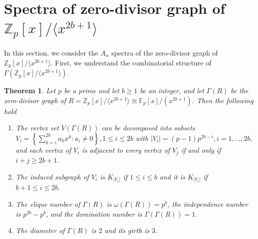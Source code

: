 \documentclass[12pt,twoside]{article}
\newtheorem{theorem}{Theorem}[section]
\begin{document}
\section{Spectra of zero-divisor graph of $\mathbb{Z}_p[x]/\langle x^{2b+1}\rangle $}\label{section 3}
In this section, we consider the $A_{\alpha}$ spectra of the zero-divisor graph of $\mathbb{Z}_p[x]/\langle x^{2b+1}\rangle $. First, we understand the combinatorial structure of $  \varGamma(\mathbb{Z}_p[x]/\langle x^{2b+1}\rangle).$
\begin{theorem} \label{odd case}
	Let $p$ be a prime and let $b\ge 1$ be an integer, and let $ \varGamma(R)$ be the zero-divisor graph of $R=\mathbb{Z}_p[x]/\langle x^{2b+1}\rangle \cong \mathbb{F}_p[x]/(x^{2b+1})$. Then the following hold
	\begin{enumerate}
		\item The vertex set $V( \varGamma(R))$ can be decomposed into subsets $V_i
		= \left\{
		\sum_{k=i}^{2b} a_k x^k : a_i \neq 0
		\right\},  1\le i \le 2b$ with $ 	|V_i|
		= (p-1)p^{ 2b-i},  i=1,\dots,2b,$ and each vertex of $V_{i}$ is adjacent to every vertex of $V_{j}$ if and only if $i+j\geq 2b+1.$
		\item The induced subgraph of $V_{i}$ is $\overline{K}_{|V_{i}|}$ if $1\leq i\leq b$ and it is $K_{|V_{i}|}$ if $b+1\leq i\leq 2b.$
		\item The clique number of $ \varGamma(R)$ is $\omega( \varGamma(R))=p^{b}$, the independence number is $p^{2b} - p^b$, and the domination number is $ \varGamma( \varGamma(R))=1$.
		\item The diameter of $ \varGamma(R)$ is $2$ and its girth is $3.$ 
	\end{enumerate}
\end{theorem}
\end{document}
